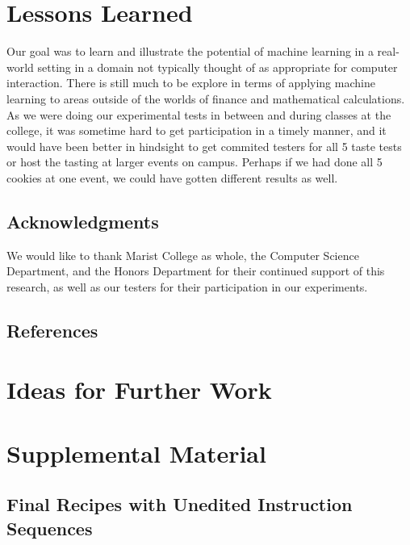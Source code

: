 \documentclass[11pt, a4paper]{article}
\begin{document}
		\section{Lessons Learned}
		Our goal was to learn and illustrate the potential of machine learning in a real-world setting in a domain not typically thought of as appropriate for computer interaction. There is still much to be explore in terms of applying machine learning to areas outside of the worlds of finance and mathematical calculations. As we were doing our experimental tests in between and during classes at the college, it was sometime hard to get participation in a timely manner, and it would have been better in hindsight to get commited testers for all 5 taste tests or host the tasting at larger events on campus. Perhaps if we had done all 5 cookies at one event, we could have gotten different results as well.

		\subsection*{Acknowledgments}
		We would like to thank Marist College as whole, the Computer Science Department, and the Honors Department for their continued support of this research, as well as our testers for their participation in our experiments.
		\subsection*{References}
		\section{Ideas for Further Work}
		\section{Supplemental Material}
		\subsection{Final Recipes with Unedited Instruction Sequences}
\end{document}
